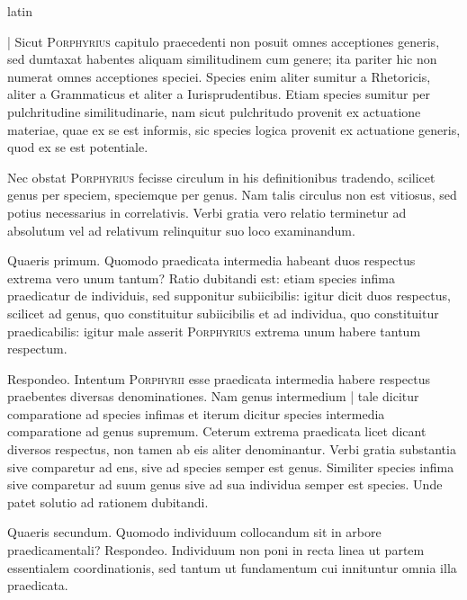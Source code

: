 \begin{otherlanguage*}{latin}
        \pstart
        \pend
      
\pstart
 \textnormal{|} Sicut \textsc{Porphyrius} capitulo praecedenti non posuit omnes acceptiones generis, sed dumtaxat habentes aliquam similitudinem cum genere; ita pariter hic non numerat omnes acceptiones speciei. Species enim aliter sumitur a Rhetoricis, aliter a Grammaticus et aliter a Iurisprudentibus. Etiam species sumitur per pulchritudine similitudinarie, nam sicut pulchritudo provenit ex actuatione materiae, quae ex se est informis, sic species logica provenit ex actuatione generis, quod ex se est potentiale. 
\pend

\pstart
 Nec obstat \textsc{Porphyrius} fecisse circulum in his definitionibus tradendo, scilicet genus per speciem, speciemque per genus. Nam talis circulus non est vitiosus, sed potius necessarius in correlativis. Verbi gratia vero relatio terminetur ad absolutum vel ad relativum relinquitur suo loco examinandum. 
\pend

\pstart
 Quaeris primum. Quomodo praedicata intermedia habeant duos respectus extrema vero unum tantum? Ratio dubitandi est: etiam species infima praedicatur de individuis, sed supponitur subiicibilis: igitur dicit duos respectus, scilicet ad genus, quo constituitur subiicibilis et ad individua, quo constituitur praedicabilis: igitur male asserit \textsc{Porphyrius} extrema unum habere tantum respectum. 
\pend

\pstart
 Respondeo. Intentum \textsc{Porphyrii} esse praedicata intermedia  habere respectus praebentes diversas denominationes. Nam genus intermedium \textnormal{|} tale dicitur comparatione ad species infimas et iterum dicitur species intermedia comparatione ad genus supremum. Ceterum extrema praedicata licet dicant diversos respectus, non tamen ab eis aliter denominantur. Verbi gratia substantia sive comparetur ad ens, sive ad species semper est genus. Similiter species infima sive comparetur ad suum genus sive ad sua individua semper est species. Unde patet solutio ad rationem dubitandi. 
\pend

\pstart
 Quaeris secundum. Quomodo individuum collocandum sit in arbore praedicamentali? Respondeo. Individuum non poni in recta linea ut partem essentialem coordinationis, sed tantum ut fundamentum cui innituntur omnia illa praedicata. 
\pend


\end{otherlanguage*}
